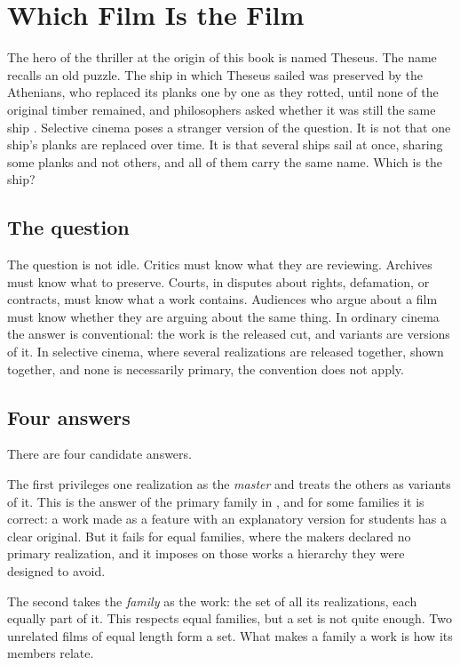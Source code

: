 \chapter{Which Film Is the Film}\label{ch:which-film}

The hero of the thriller at the origin of this book is named Theseus. The name recalls an old puzzle. The ship in which Theseus sailed was preserved by the Athenians, who replaced its planks one by one as they rotted, until none of the original timber remained, and philosophers asked whether it was still the same ship \cite{plutarch}. Selective cinema poses a stranger version of the question. It is not that one ship's planks are replaced over time. It is that several ships sail at once, sharing some planks and not others, and all of them carry the same name. Which is the ship?

\section{The question}

The question is not idle. Critics must know what they are reviewing. Archives must know what to preserve. Courts, in disputes about rights, defamation, or contracts, must know what a work contains. Audiences who argue about a film must know whether they are arguing about the same thing. In ordinary cinema the answer is conventional: the work is the released cut, and variants are versions of it. In selective cinema, where several realizations are released together, shown together, and none is necessarily primary, the convention does not apply.

\section{Four answers}

There are four candidate answers.

The first privileges one realization as the \emph{master} and treats the others as variants of it. This is the answer of the primary family in , and for some families it is correct: a work made as a feature with an explanatory version for students has a clear original. But it fails for equal families, where the makers declared no primary realization, and it imposes on those works a hierarchy they were designed to avoid.

The second takes the \emph{family} as the work: the set of all its realizations, each equally part of it. This respects equal families, but a set is not quite enough. Two unrelated films of equal length form a set. What makes a family a work is how its members relate.

